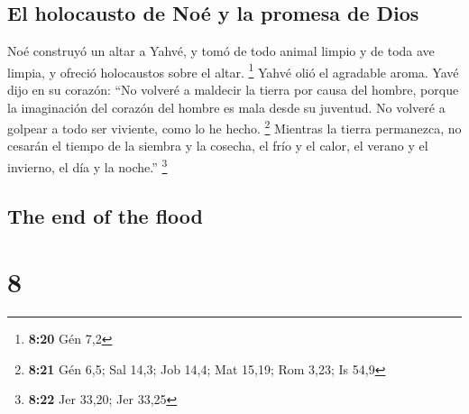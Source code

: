\begin{paracol}{2}
\hypertarget{el-holocausto-de-nouxe9-y-la-promesa-de-dios}{%
\subsection{El holocausto de Noé y la promesa de
Dios}\label{el-holocausto-de-nouxe9-y-la-promesa-de-dios}}

 Noé construyó un altar a Yahvé, y tomó de todo animal
limpio y de toda ave limpia, y ofreció holocaustos sobre el altar.
\footnote{\textbf{8:20} Gén 7,2}  Yahvé olió el agradable
aroma. Yavé dijo en su corazón: ``No volveré a maldecir la tierra por
causa del hombre, porque la imaginación del corazón del hombre es mala
desde su juventud. No volveré a golpear a todo ser viviente, como lo he
hecho. \footnote{\textbf{8:21} Gén 6,5; Sal 14,3; Job 14,4; Mat 15,19;
  Rom 3,23; Is 54,9}  Mientras la tierra permanezca, no
cesarán el tiempo de la siembra y la cosecha, el frío y el calor, el
verano y el invierno, el día y la noche.'' \footnote{\textbf{8:22} Jer
  33,20; Jer 33,25}

\switchcolumn
\begin{otherlanguage}{english}

\hypertarget{the-end-of-the-flood}{%
\subsection{The end of the flood}\label{the-end-of-the-flood}}

\hypertarget{section-15}{%
\section{8}\label{section-15}}


\end{otherlanguage}
\end{paracol}
